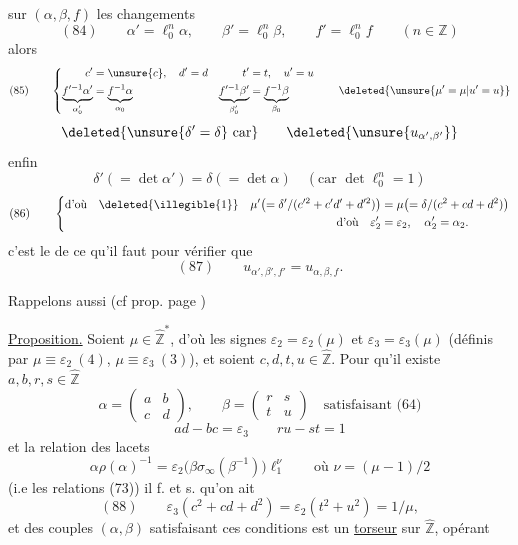 
sur $(\alpha,\beta,f)$ les changements 
\[
(84)\qquad
\alpha'=\ell_0^n\alpha,\qquad\beta'=\ell_0^n\beta,\qquad f'=\ell_0^n f
\qquad(n\in\mathbb Z)
\]
alors 
\[
(85)\qquad
\left\{\begin{aligned}
c'&=\unsure{c},\quad d'=d& t'&=t,\quad u'=u\\
\underbrace{f'^{-1}\alpha'}_{\alpha'_0}&=\underbrace{f^{-1}\alpha}_{\alpha_0}&
\underbrace{f'^{-1}\beta'}_{\beta'_0}&=\underbrace{f^{-1}\beta}_{\beta_0}
\end{aligned}\right.
\qquad\deleted{\unsure{\mu'=\mu|u'=u}}
\]
\[
\deleted{\unsure{\delta'=\delta}\text{ car}}
\qquad\deleted{\unsure{u_{\alpha',\beta'}}}
\]
enfin
\[
\delta'(=\det\alpha')=\delta(=\det\alpha)\quad(\text{car }\det \ell_0^n=1)
\]
\[
(86)\qquad
\left\{\begin{aligned}
\text{d'où}\quad\deleted{\illegible{1}}\quad
\mu'\bigl(=\delta'/(c'^2+c'd'+d'^2)\bigr)&=\mu\bigl(=\delta/(c^2+cd+d^2)\bigr)\\
\text{d'où}\quad\varepsilon'_2&=\varepsilon_2,\quad\alpha'_2=\alpha_2.
\end{aligned}\right.
\]
c'est le  de ce qu'il faut pour vérifier  que
\[
(87)\qquad u_{\alpha',\beta',f'}=u_{\alpha,\beta,f}.
\]

Rappelons aussi (cf prop. page )

\uline{Proposition.} Soient $\mu\in\widehat{\mathbb Z}^*$, d'où les signes $\varepsilon_2=\varepsilon_2(\mu)$ et $\varepsilon_3=\varepsilon_3(\mu)$ (définis par $\mu\equiv\varepsilon_2\ (4)$, $\mu\equiv\varepsilon_3\ (3)$), et soient $c,d,t,u\in\widehat{\mathbb Z}$. Pour qu'il existe $a,b,r,s\in\widehat{\mathbb Z}$
\[
\alpha=\begin{pmatrix}a&b\\c&d\end{pmatrix},\qquad
\beta=\begin{pmatrix}r&s\\t&u\end{pmatrix}
\quad\text{satisfaisant (64)}
\]
\[
ad-bc=\varepsilon_3\qquad ru-st=1
\]
et la relation des lacets
\[
\alpha\rho(\alpha)^{-1}=\varepsilon_2\bigl(\beta\sigma_\infty(\beta^{-1})\bigr)\ell_1^\nu
\qquad\text{où }\nu=(\mu-1)/2
\]
(i.e les relations (73)) il f. et s. qu'on ait
\[
(88)\qquad\varepsilon_3(c^2+cd+d^2)=\varepsilon_2(t^2+u^2)=1/\mu,
\]
et  des couples $(\alpha,\beta)$ satisfaisant ces conditions est un \uline{torseur} sur $\widehat{\mathbb Z}$, opérant


